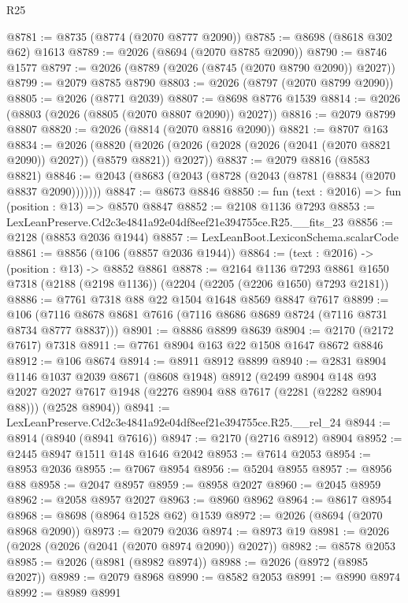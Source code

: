 \begin{lexlean}{R25}
\begin{coremodule}
@8781 := @8735 (@8774 (@2070 @8777 @2090))
@8785 := @8698 (@8618 @302 @62) @1613
@8789 := @2026 (@8694 (@2070 @8785 @2090))
@8790 := @8746 @1577
@8797 := @2026 (@8789 (@2026 (@8745 (@2070 @8790 @2090)) @2027))
@8799 := @2079 @8785 @8790
@8803 := @2026 (@8797 (@2070 @8799 @2090))
@8805 := @2026 (@8771 @2039)
@8807 := @8698 @8776 @1539
@8814 := @2026 (@8803 (@2026 (@8805 (@2070 @8807 @2090)) @2027))
@8816 := @2079 @8799 @8807
@8820 := @2026 (@8814 (@2070 @8816 @2090))
@8821 := @8707 @163
@8834 := @2026
    (@8820 (@2026 (@2026 (@2028 (@2026 (@2041 (@2070 @8821 @2090)) @2027)) (@8579 @8821)) @2027))
@8837 := @2079 @8816 (@8583 @8821)
@8846 := @2043 (@8683 (@2043 (@8728 (@2043 (@8781 (@8834 (@2070 @8837 @2090)))))))
@8847 := @8673 @8846
@8850 := fun (text : @2016) => fun (position : @13) => @8570 @8847
@8852 := @2108 @1136 @7293
@8853 := LexLeanPreserve.Cd2c3e4841a92e04df8eef21e394755ce.R25.__fits_23
@8856 := @2128 (@8853 @2036 @1944)
@8857 := LexLeanBoot.LexiconSchema.scalarCode
@8861 := @8856 (@106 (@8857 @2036 @1944))
@8864 := (text : @2016) -> (position : @13) -> @8852 @8861
@8878 := @2164
    @1136
    @7293
    @8861
    @1650
    @7318
    (@2188 (@2198 @1136))
    (@2204 (@2205 (@2206 @1650) @7293 @2181))
@8886 := @7761 @7318 @88 @22 @1504 @1648 @8569 @8847 @7617
@8899 := @106 (@7116 @8678 @8681 @7616 (@7116 @8686 @8689 @8724 (@7116 @8731 @8734 @8777 @8837)))
@8901 := @8886 @8899 @8639
@8904 := @2170 (@2172 @7617) @7318
@8911 := @7761 @8904 @163 @22 @1508 @1647 @8672 @8846
@8912 := @106 @8674
@8914 := @8911 @8912 @8899
@8940 := @2831
    @8904
    @1146
    @1037
    @2039
    @8671
    (@8608 @1948)
    @8912
    (@2499
      @8904
      @148
      @93
      @2027
      @2027
      @7617
      @1948
      (@2276 @8904 @88 @7617 (@2281 (@2282 @8904 @88)))
      (@2528 @8904))
@8941 := LexLeanPreserve.Cd2c3e4841a92e04df8eef21e394755ce.R25.__rel_24
@8944 := @8914 (@8940 (@8941 @7616))
@8947 := @2170 (@2716 @8912) @8904
@8952 := @2445 @8947 @1511 @148 @1646 @2042
@8953 := @7614 @2053
@8954 := @8953 @2036
@8955 := @7067 @8954
@8956 := @5204 @8955
@8957 := @8956 @88
@8958 := @2047 @8957
@8959 := @8958 @2027
@8960 := @2045 @8959
@8962 := @2058 @8957 @2027
@8963 := @8960 @8962
@8964 := @8617 @8954
@8968 := @8698 (@8964 @1528 @62) @1539
@8972 := @2026 (@8694 (@2070 @8968 @2090))
@8973 := @2079 @2036
@8974 := @8973 @19
@8981 := @2026 (@2028 (@2026 (@2041 (@2070 @8974 @2090)) @2027))
@8982 := @8578 @2053
@8985 := @2026 (@8981 (@8982 @8974))
@8988 := @2026 (@8972 (@8985 @2027))
@8989 := @2079 @8968
@8990 := @8582 @2053
@8991 := @8990 @8974
@8992 := @8989 @8991

\end{coremodule}
\end{lexlean}
